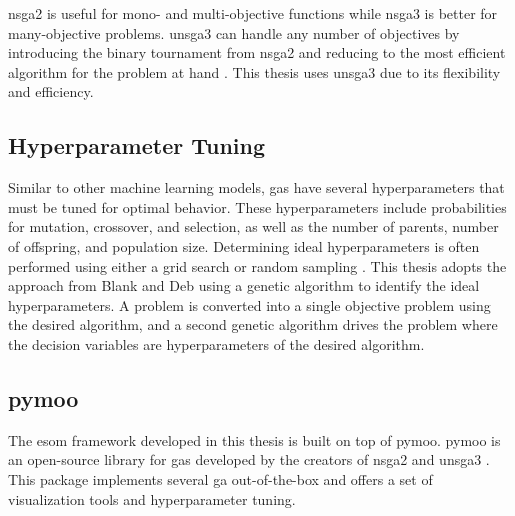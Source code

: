 \ac{nsga2} is useful for mono- and multi-objective functions while \ac{nsga3} is
better for many-objective problems. \ac{unsga3} can handle any number of
objectives by introducing the binary tournament from \ac{nsga2} and reducing to
the most efficient algorithm for the problem at hand \cite{seada_unified_2016}.
This thesis uses \ac{unsga3} due to its flexibility and efficiency.

\subsection{Hyperparameter Tuning}
Similar to other machine learning models, \acp{ga} have several hyperparameters
that must be tuned for optimal behavior. These hyperparameters include
probabilities for mutation, crossover, and selection, as well as the number of
parents, number of offspring, and population size. Determining ideal
hyperparameters is often performed using either a grid search or random sampling
\cite{bergstra_random_2012}. This thesis adopts the approach from Blank and Deb
\cite{blank_pymoo_2020} using a genetic algorithm to identify the ideal
hyperparameters. A problem is converted into a single objective problem using
the desired algorithm, and a second genetic algorithm drives the problem where
the decision variables are hyperparameters of the desired algorithm.

\subsection{\Acl{pymoo}}

The \ac{esom} framework developed in this thesis is built on top of \ac{pymoo}.
\ac{pymoo} is an open-source library for \acp{ga} developed by the creators of
\ac{nsga2} and \ac{unsga3} \cite{blank_pymoo_2020}. This package implements
several \ac{ga} out-of-the-box and offers a set of visualization tools and
hyperparameter tuning.




